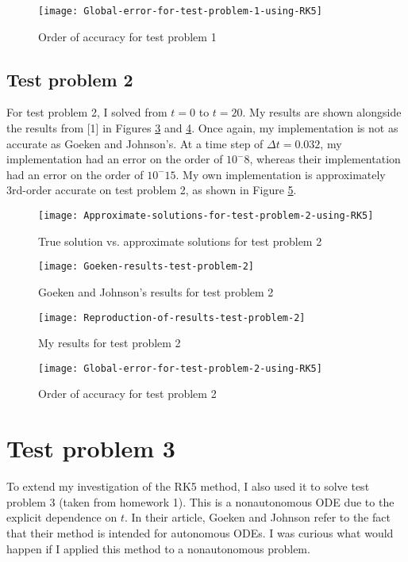 \documentclass{article}
\begin{document}
\begin{figure}[H]
	\centering
	\texttt{[image: Global-error-for-test-problem-1-using-RK5]}
	\caption{Order of accuracy for test problem 1}
	\label{fig:Global-error-for-test-problem-1-using-RK5}
\end{figure}

\subsection{Test problem 2}
For test problem 2, I solved from $t = 0$ to $t = 20$.  My results are shown alongside the results from [1] in Figures \ref{fig:Goeken-results-test-problem-2} and \ref{fig:Reproduction-of-results-test-problem-2}. Once again, my implementation is not as accurate as Goeken and Johnson's.  At a time step of $\Delta t = 0.032$, my implementation had an error on the order of $10^-8$, whereas their implementation had an error on the order of $10^-15$. My own implementation is approximately 3rd-order accurate on test problem 2, as shown in Figure \ref{fig:Global-error-for-test-problem-2-using-RK5}.

\begin{figure}[H]
	\centering
	\texttt{[image: Approximate-solutions-for-test-problem-2-using-RK5]}
	\caption{True solution vs. approximate solutions for test problem 2}
	\label{fig:Approximate-solutions-for-test-problem-2-using-RK5}
\end{figure}

\begin{figure}[H]
	\centering
	\texttt{[image: Goeken-results-test-problem-2]}
	\caption{Goeken and Johnson's results for test problem 2}
	\label{fig:Goeken-results-test-problem-2}
\end{figure}

\begin{figure}[H]
	\centering
	\texttt{[image: Reproduction-of-results-test-problem-2]}
	\caption{My results for test problem 2}
	\label{fig:Reproduction-of-results-test-problem-2}
\end{figure}

\begin{figure}[H]
	\centering
	\texttt{[image: Global-error-for-test-problem-2-using-RK5]}
	\caption{Order of accuracy for test problem 2}
	\label{fig:Global-error-for-test-problem-2-using-RK5}
\end{figure}

\section{Test problem 3}
To extend my investigation of the RK5 method, I also used it to solve test problem 3 (taken from homework 1).  This is a nonautonomous ODE due to the explicit dependence on $t$.  In their article, Goeken and Johnson refer to the fact that their method is intended for autonomous ODEs.  I was curious what would happen if I applied this method to a nonautonomous problem.
\end{document}
